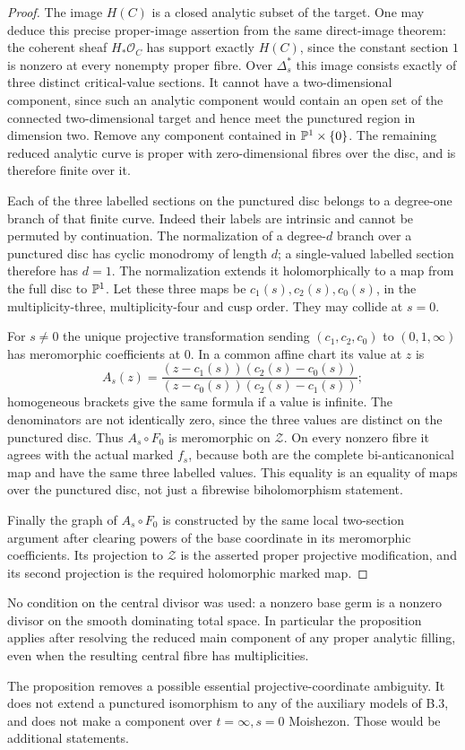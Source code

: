 \begin{proof}
The image $H(C)$ is a closed analytic subset of the target.
One may deduce this precise proper-image assertion from the same
direct-image theorem: the coherent sheaf
$H_*\mathcal O_C$ has support exactly $H(C)$, since the
constant section $1$ is nonzero at every nonempty proper fibre.
Over $\Delta_s^*$ this image consists exactly of three distinct
critical-value sections. It cannot have a two-dimensional
component, since such an analytic component would contain an
open set of the connected two-dimensional target and hence meet
the punctured region in dimension two. Remove any component
contained in $\mathbb P^1\times\{0\}$. The remaining reduced
analytic curve is proper with zero-dimensional fibres over the
disc, and is therefore finite over it.

Each of the three labelled sections on the punctured disc belongs
to a degree-one branch of that finite curve. Indeed their labels
are intrinsic and cannot be permuted by continuation. The
normalization of a degree-$d$ branch over a punctured disc has
cyclic monodromy of length $d$; a single-valued labelled section
therefore has $d=1$. The normalization extends it holomorphically
to a map from the full disc to $\mathbb P^1$. Let these three maps be
$c_1(s),c_2(s),c_0(s)$, in the multiplicity-three,
multiplicity-four and cusp order. They may collide at $s=0$.

For $s\ne0$ the unique projective transformation sending
$(c_1,c_2,c_0)$ to $(0,1,\infty)$ has meromorphic coefficients
at $0$. In a common affine chart its value at $z$ is
\[
 A_s(z)=
 \frac{(z-c_1(s))(c_2(s)-c_0(s))}
      {(z-c_0(s))(c_2(s)-c_1(s))};
\]
homogeneous brackets give the same formula if a value is infinite.
The denominators are not identically zero, since the three values
are distinct on the punctured disc. Thus $A_s\circ F_0$ is
meromorphic on $\mathcal Z$. On every nonzero fibre it agrees
with the actual marked $f_s$, because both are the complete
bi-anticanonical map and have the same three labelled values.
This equality is an equality of maps over the punctured disc,
not just a fibrewise biholomorphism statement.

Finally the graph of $A_s\circ F_0$ is constructed by the same
local two-section argument after clearing powers of the base
coordinate in its meromorphic coefficients. Its projection to
$\mathcal Z$ is the asserted proper projective modification,
and its second projection is the required holomorphic marked map.
\end{proof}

No condition on the central divisor was used: a nonzero base
germ is a nonzero divisor on the smooth dominating total space.
In particular the proposition applies after resolving the
reduced main component of any proper analytic filling, even
when the resulting central fibre has multiplicities.

The proposition removes a possible essential projective-coordinate
ambiguity. It does not extend a punctured isomorphism to any of
the auxiliary models of B.3, and does not make a component over
$t=\infty,s=0$ Moishezon. Those would be additional statements.
